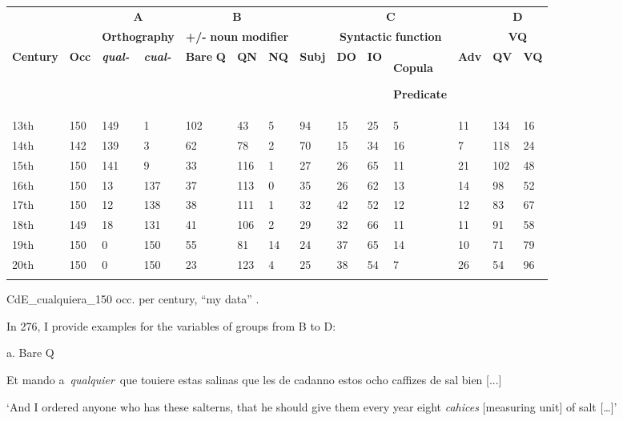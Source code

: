 \begin{table}
\begin{tabularx}{\textwidth}{XXXXXXXXXXXXXX}
\lsptoprule
\multicolumn{1}{c}{} &  & \multicolumn{2}{c}{ \textbf{A}} & \multicolumn{3}{c}{ \textbf{B}} & \multicolumn{5}{c}{ \textbf{C}} & \multicolumn{2}{c}{ \textbf{D}}\\
\multicolumn{1}{c}{} &  & \multicolumn{2}{c}{ \textbf{Orthography}} & \multicolumn{3}{c}{ \textbf{+/-} \textbf{noun} \textbf{modifier}} & \multicolumn{5}{c}{ \textbf{Syntactic} \textbf{function}} & \multicolumn{2}{c}{ \textbf{VQ}}\\
 \textbf{Century} & \textbf{Occ} & \textbf{\textit{qual-}} & \textbf{\textit{cual-}} & \textbf{Bare} \textbf{Q} & \textbf{QN} & \textbf{NQ} & \textbf{Subj} & \textbf{DO} & \textbf{IO} & { \textbf{Copula}}

 \textbf{Predicate} & \textbf{Adv} & \textbf{QV} & \textbf{VQ}\\
 13th & 150 & 149 & 1 & 102 & 43 & 5 & 94 & 15 & 25 & 5 & 11 & 134 & 16\\
 14th & 142 & 139 & 3 & 62 & 78 & 2 & 70 & 15 & 34 & 16 & 7 & 118 & 24\\
 15th & 150 & 141 & 9 & 33 & 116 & 1 & 27 & 26 & 65 & 11 & 21 & 102 & 48\\
 16th & 150 & 13 & 137 & 37 & 113 & 0 & 35 & 26 & 62 & 13 & 14 & 98 & 52\\
 17th & 150 & 12 & 138 & 38 & 111 & 1 & 32 & 42 & 52 & 12 & 12 & 83 & 67\\
 18th & 149 & 18 & 131 & 41 & 106 & 2 & 29 & 32 & 66 & 11 & 11 & 91 & 58\\
 19th & 150 & 0 & 150 & 55 & 81 & 14 & 24 & 37 & 65 & 14 & 10 & 71 & 79\\
 20th & 150 & 0 & 150 & 23 & 123 & 4 & 25 & 38 & 54 & 7 & 26 & 54 & 96\\
\lspbottomrule
\end{tabularx}
\caption{\label{tab:} ~}CdE\_cualquiera\_150 occ. per century, “my data” .
\end{table}

In 276, I provide examples for the variables of groups from B to D:

  a.  Bare Q

    Et mando a~\textit{qualquier}~que touiere estas salinas que les de cadanno estos ocho caffizes de sal bien [...] 

    ‘And I ordered anyone who has these salterns, that he should give them every year eight \textit{cahices} [measuring unit] of salt […]’

